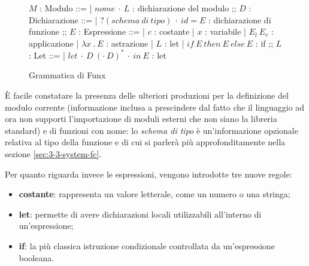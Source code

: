 \newpage

\begin{figure}[H]
    \centering
    \begin{spacedbnf}
        $M$ : \small{Modulo} ::=
        | $nome\ \cdot\ L$ : \small{dichiarazione del modulo}
        ;;
        $D$ : \small{Dichiarazione} ::=
        | $?(schema\ di\ tipo)\ \cdot\ id = E$ : \small{dichiarazione di funzione}
        ;;
        $E$ : \small{Espressione} ::=
        | $c$ : \small{costante}
        | $x$ : \small{variabile}
        | $E_l\ E_r$ : \small{applicazione}
        | $\lambda x\ .\ E$ : \small{astrazione}
        | $L$ : \small{let}
        | $if\ E\ then\ E\ else\ E$ : \small{if}
        ;;
        $L$ : \small{Let} ::=
        | $let\ \cdot\ D\ (\cdot\ D)^*\ \cdot\ in\ E$ : \small{let}
    \end{spacedbnf}
    \caption{Grammatica di Funx}
    \label{fig:2-funx-syntax}
    \vspace{4mm}
\end{figure}

\noindent È facile constatare la presenza delle ulteriori produzioni per la definizione del modulo corrente
(informazione inclusa a prescindere dal fatto che il linguaggio ad ora non supporti l'importazione di moduli esterni
che non siano la libreria standard) e di funzioni con nome: lo \textit{schema di tipo} è un'informazione opzionale
relativa al tipo della funzione e di cui si parlerà più approfonditamente nella sezione \ref{sec:3-3-system-fc}.

\noindent Per quanto riguarda invece le espressioni, vengono introdotte tre nuove regole:
\begin{itemize}
    \item \textbf{costante}: rappresenta un valore letterale, come un numero o una stringa;
    \item \textbf{let}: permette di avere dichiarazioni locali utilizzabili all'interno di un'espressione;
    \item \textbf{if}: la più classica istruzione condizionale controllata da un'espressione booleana.
\end{itemize}
